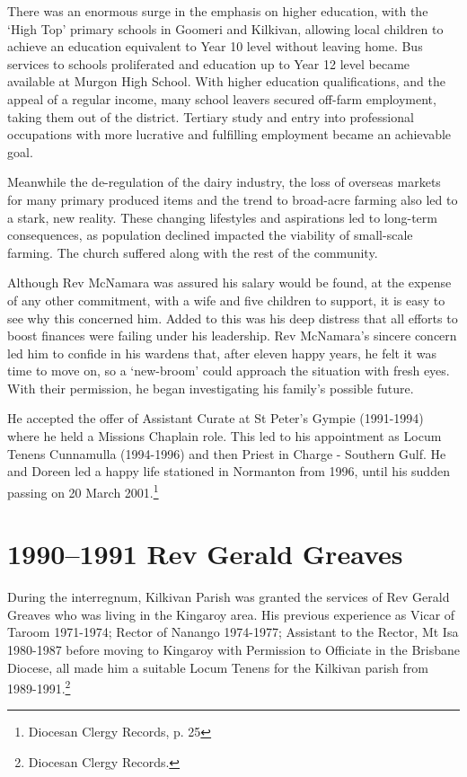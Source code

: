 There was an enormous surge in the emphasis on higher education, with the `High Top' primary schools in Goomeri and Kilkivan, allowing local children to achieve an education equivalent to Year 10 level without leaving home. Bus services to schools proliferated and education up to Year 12 level became available at Murgon High School. With higher education qualifications, and the appeal of a regular income, many school leavers secured off-farm employment, taking them out of the district. Tertiary study and entry into professional occupations with more lucrative and fulfilling employment became an achievable goal.



Meanwhile the de-regulation of the dairy industry, the loss of overseas markets for many primary produced items and the trend to broad-acre farming also led to a stark, new reality. These changing lifestyles and aspirations led to long-term consequences, as population declined impacted the viability of small-scale farming. The church suffered along with the rest of the community.



Although Rev McNamara was assured his salary would be found, at the expense of any other commitment, with a wife and five children to support, it is easy to see why this concerned him. Added to this was his deep distress that all efforts to boost finances were failing under his leadership. Rev McNamara's sincere concern led him to confide in his wardens that, after eleven happy years, he felt it was time to move on, so a `new-broom' could approach the situation with fresh eyes. With their permission, he began investigating his family's possible future.



He accepted the offer of Assistant Curate at St Peter's Gympie (1991-1994) where he held a Missions Chaplain role. This led to his appointment as Locum Tenens Cunnamulla (1994-1996) and then Priest in Charge - Southern Gulf. He and Doreen led a happy life stationed in Normanton from 1996, until his sudden passing on 20 March 2001.\footnote{Diocesan Clergy Records, p. 25}


\section{1990--1991 Rev Gerald Greaves}



\balance


During the interregnum, Kilkivan Parish was granted the services of Rev Gerald Greaves who was living in the Kingaroy area. His previous experience as Vicar of Taroom 1971-1974; Rector of Nanango 1974-1977; Assistant to the Rector, Mt Isa 1980-1987 before moving to Kingaroy with Permission to Officiate in the Brisbane Diocese, all made him a suitable Locum Tenens for the Kilkivan parish from 1989-1991.\footnote{Diocesan Clergy Records.}









